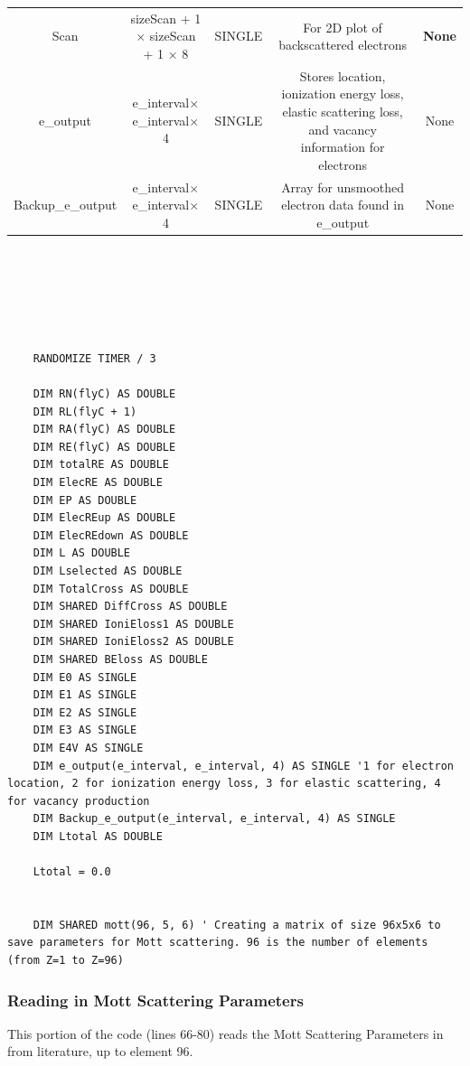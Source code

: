 \documentclass[10pt, reqno]{exam}
\begin{document}
\begin{table}[h]
\begin{tabular}{|c|c|c|c|c|}
        Scan & sizeScan + 1 $\times$ sizeScan + 1 $\times$ 8 & SINGLE & For 2D plot of backscattered electrons & \textbf{None} \\
        e\_output & e\_interval$\times$ e\_interval$\times$ 4  &  SINGLE  & Stores location, ionization energy loss, elastic scattering loss, and vacancy information for electrons & None   \\
        Backup\_e\_output & e\_interval$\times$ e\_interval$\times$ 4 & SINGLE & Array for unsmoothed electron data found in e\_output & None \\
        \hline
    \end{tabular}
    \label{tbl:arrays} \\
\end{table}
{
\begin{verbatim}




    RANDOMIZE TIMER / 3
    
    DIM RN(flyC) AS DOUBLE
    DIM RL(flyC + 1)
    DIM RA(flyC) AS DOUBLE
    DIM RE(flyC) AS DOUBLE
    DIM totalRE AS DOUBLE
    DIM ElecRE AS DOUBLE
    DIM EP AS DOUBLE
    DIM ElecREup AS DOUBLE
    DIM ElecREdown AS DOUBLE
    DIM L AS DOUBLE
    DIM Lselected AS DOUBLE
    DIM TotalCross AS DOUBLE
    DIM SHARED DiffCross AS DOUBLE
    DIM SHARED IoniEloss1 AS DOUBLE
    DIM SHARED IoniEloss2 AS DOUBLE
    DIM SHARED BEloss AS DOUBLE
    DIM E0 AS SINGLE
    DIM E1 AS SINGLE
    DIM E2 AS SINGLE
    DIM E3 AS SINGLE
    DIM E4V AS SINGLE
    DIM e_output(e_interval, e_interval, 4) AS SINGLE '1 for electron location, 2 for ionization energy loss, 3 for elastic scattering, 4 for vacancy production
    DIM Backup_e_output(e_interval, e_interval, 4) AS SINGLE
    DIM Ltotal AS DOUBLE
    
    Ltotal = 0.0
    
    
    DIM SHARED mott(96, 5, 6) ' Creating a matrix of size 96x5x6 to save parameters for Mott scattering. 96 is the number of elements (from Z=1 to Z=96) 
\end{verbatim}
\subsubsection{Reading in Mott Scattering Parameters}

This portion of the code (lines 66-80) reads the Mott Scattering Parameters in from literature, up to element 96. \par

}
\end{document}
